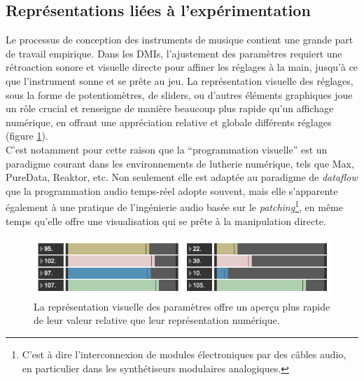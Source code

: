 \subsection{Représentations liées à l'expérimentation}

\noindent Le processus de conception des instruments de musique contient une grande part de travail empirique. Dans les \glspl{DMI}, l'ajustement des paramètres requiert une rétroaction sonore et visuelle directe pour affiner les réglages à la main, jusqu'à ce que l'instrument sonne et se prête au jeu. La représentation visuelle des réglages, sous la forme de potentiomètres, de sliders, ou d'autres éléments graphiques joue un rôle crucial et renseigne de manière beaucoup plus rapide qu'un affichage numérique, en offrant une appréciation relative et globale différents réglages (figure \ref{fig:visual_representation:numbers-vs-sliders}).\\
\indent C'est notamment pour cette raison que la ``programmation visuelle'' est un paradigme courant dans les environnements de lutherie numérique, tels que Max, PureData, Reaktor, etc. Non seulement elle est adaptée au paradigme de \textit{dataflow} que la programmation audio temps-réel adopte souvent, mais elle s'apparente également à une pratique de l'ingénierie audio basée sur le \textit{patching}\footnote{C'est à dire l'interconnexion de modules électroniques par des câbles audio, en particulier dans les synthétiseurs modulaires analogiques.}, en même temps qu'elle offre une visualisation qui se prête à la manipulation directe.

\begin{figure}[!htbp]
	\captionsetup{format=plain}%
	\includegraphics[width=\textwidth]{gfx/06_visual_representation/NumbersVsSliders.png}
	\caption[Représentation numérique et visuelle des paramètres]{La représentation visuelle des paramètres offre un aperçu plus rapide de leur valeur relative que leur représentation numérique.}
	\label{fig:visual_representation:numbers-vs-sliders}
\end{figure}


